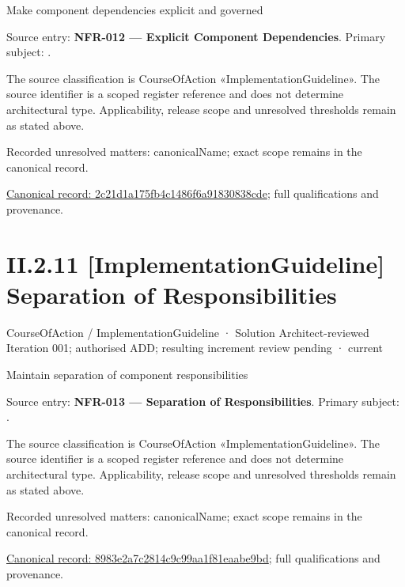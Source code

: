 Make component dependencies explicit and governed



Source entry: \textbf{NFR-012 — Explicit Component Dependencies}. Primary subject: \texttt{}.



The source classification is CourseOfAction «ImplementationGuideline». The source identifier is a scoped register reference and does not determine architectural type. Applicability, release scope and unresolved thresholds remain as stated above.


{\small Recorded unresolved matters: canonicalName; exact scope remains in the canonical record.}\par
{\footnotesize \href{../../../../../../../continuum/strategy/course-of-action/implementation-guideline/2c21d1a175fb4c1486f6a91830838cde.md}{Canonical record: 2c21d1a175fb4c1486f6a91830838cde}; full qualifications and provenance.}\par
\section*{II.2.11 [ImplementationGuideline] Separation of Responsibilities}
\label{navigation:II.2.11}

\label{element:8983e2a7c2814c9c99aa1f81eaabe9bd}
{\small CourseOfAction / ImplementationGuideline · Solution Architect-reviewed Iteration 001; authorised ADD; resulting increment review pending · current}\par

Maintain separation of component responsibilities



Source entry: \textbf{NFR-013 — Separation of Responsibilities}. Primary subject: \texttt{}.



The source classification is CourseOfAction «ImplementationGuideline». The source identifier is a scoped register reference and does not determine architectural type. Applicability, release scope and unresolved thresholds remain as stated above.


{\small Recorded unresolved matters: canonicalName; exact scope remains in the canonical record.}\par
{\footnotesize \href{../../../../../../../continuum/strategy/course-of-action/implementation-guideline/8983e2a7c2814c9c99aa1f81eaabe9bd.md}{Canonical record: 8983e2a7c2814c9c99aa1f81eaabe9bd}; full qualifications and provenance.}\par
